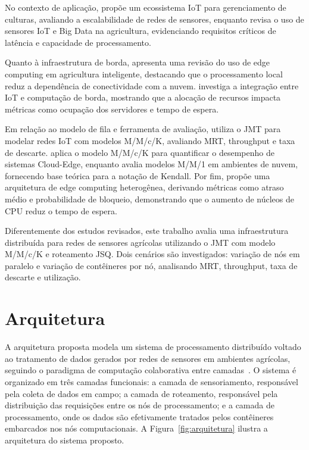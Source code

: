 \documentclass[conference]{IEEEtran}
\begin{document}
No contexto de aplicação, \cite{atalla2023iot} propõe um
ecossistema IoT para gerenciamento de culturas, avaliando a
escalabilidade de redes de sensores, enquanto
\cite{benos2023applying} revisa o uso de sensores IoT e Big
Data na agricultura, evidenciando requisitos críticos de
latência e capacidade de processamento.

Quanto à infraestrutura de borda, \cite{zhang2025edge}
apresenta uma revisão do uso de edge computing em agricultura
inteligente, destacando que o processamento local reduz a
dependência de conectividade com a nuvem. \cite{wang2022edge}
investiga a integração entre IoT e computação de borda,
mostrando que a alocação de recursos impacta métricas como
ocupação dos servidores e tempo de espera.

Em relação ao modelo de fila e ferramenta de avaliação,
\cite{santos2021iot} utiliza o JMT para modelar redes IoT com
modelos M/M/c/K, avaliando MRT, throughput e taxa de descarte.
\cite{rocha2025enhancing} aplica o modelo M/M/c/K para
quantificar o desempenho de sistemas Cloud-Edge, enquanto
\cite{mmck2024performance} avalia modelos M/M/1 em ambientes
de nuvem, fornecendo base teórica para a notação de Kendall.
Por fim, \cite{li2025modeling} propõe uma arquitetura de edge
computing heterogênea, derivando métricas como atraso médio e
probabilidade de bloqueio, demonstrando que o aumento de
núcleos de CPU reduz o tempo de espera.

Diferentemente dos estudos revisados, este trabalho avalia uma
infraestrutura distribuída para redes de sensores agrícolas
utilizando o JMT com modelo M/M/c/K e roteamento JSQ. Dois
cenários são investigados: variação de nós em paralelo e
variação de contêineres por nó, analisando MRT, throughput,
taxa de descarte e utilização.




\section{Arquitetura}

A arquitetura proposta modela um sistema de processamento
distribuído voltado ao tratamento de dados gerados por redes
de sensores em ambientes agrícolas, seguindo o paradigma de computação colaborativa entre camadas~\cite{yu2025cloud}. O sistema é organizado
em três camadas funcionais: a camada de sensoriamento,
responsável pela coleta de dados em campo; a camada de
roteamento, responsável pela distribuição das requisições
entre os nós de processamento; e a camada de processamento,
onde os dados são efetivamente tratados pelos contêineres
embarcados nos nós computacionais. A Figura~\ref{fig:arquitetura}
ilustra a arquitetura do sistema proposto.
\end{document}
